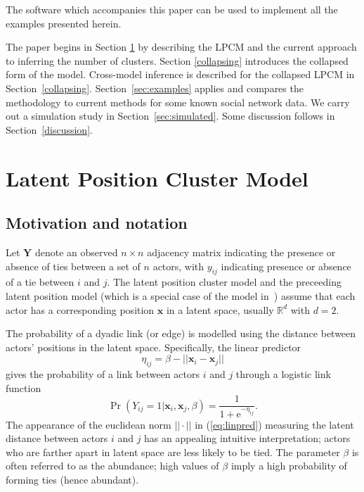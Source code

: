 \documentclass[12pt]{article}
\newcommand{\x}{{\mathbf{x}}}
\newcommand{\bY}{{\mathbf{Y}}}
\begin{document}
The software which
accompanies this paper can be used to implement all the examples presented herein.

The paper begins in Section \ref{lpcm} by describing the LPCM and the current approach to inferring the number of clusters.
Section \ref{collapsing} introduces the collapsed form of the model. 
Cross-model inference is described for the collapsed LPCM in Section~\ref{collapsing}. 
Section~\ref{sec:examples} applies and compares the methodology to current methods for some known social network data. We carry out a simulation study in Section~\ref{sec:simulated}.
Some discussion follows in Section~\ref{discussion}.
 
\section {Latent Position Cluster Model}\label{lpcm}

\subsection{Motivation and notation}

Let $\bY$ denote an observed $n \times n$ adjacency matrix indicating the presence or absence of ties between a set of $n$ actors, with $y_{ij}$ indicating presence or absence of a tie between $i$ and $j$. 
The latent position cluster model \cite{handcocketal07} and the preceeding latent position model \cite{hoff:raft:hand02} (which is a special case of the model in~) assume that each actor has a corresponding position $\x$ in a latent space, usually $\mathbb{R}^d$ with  $d=2$. 

The probability of a dyadic link (or edge) is modelled using the distance between actors' positions in the latent space. Specifically, the linear predictor
\begin{equation}
\eta_{ij} = \beta - || \x_i - \x_j ||  \label{eq:linpred}
\end{equation}
gives the probability of a link between actors $i$ and $j$ through a logistic link function
\[
\Pr \left( Y_{ij} = 1 | \x_i, \x_j, \beta \right) = \frac{1}{1 + \mathrm{e}^{-\eta_{ij}}}.
\]
The appearance of the euclidean norm $|| \cdot ||$ in (\ref{eq:linpred}) measuring the latent distance between actors $i$ and $j$ has an appealing intuitive interpretation; actors who are farther apart in latent space are less likely to be tied. The parameter $\beta$ is often referred to as the abundance; high values of $\beta$ imply a high probability of forming ties (hence abundant).
\end{document}
